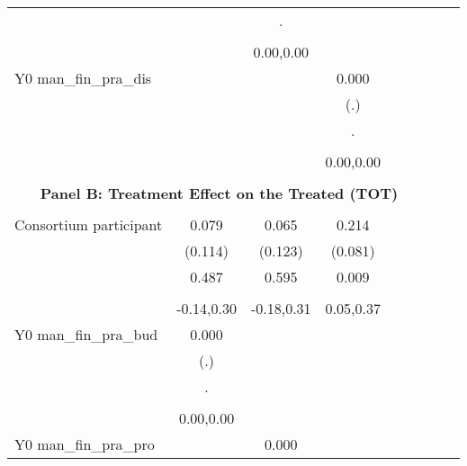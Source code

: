 \begin{table}[!h]
\begin{adjustbox}{width=\columnwidth,center}
\begin{tabular}{l*{8}{c}}
                    &                     &           .         &                     \\
                    &                     &                     &                     \\
                    &                     &   0.00,0.00         &                     \\
Y0 man\_fin\_pra\_dis  &                     &                     &       0.000         \\
                    &                     &                     &         (.)         \\
                    &                     &                     &           .         \\
                    &                     &                     &                     \\
                    &                     &                     &   0.00,0.00         \\
\hline \\ \multicolumn{7}{c}{\textbf{Panel B: Treatment Effect on the Treated (TOT)}} \\\\[-1ex]
Consortium participant&       0.079         &       0.065         &       0.214\sym{***}\\
                    &     (0.114)         &     (0.123)         &     (0.081)         \\
                    &       0.487         &       0.595         &       0.009         \\
                    &                     &                     &                     \\
                    &  -0.14,0.30         &  -0.18,0.31         &   0.05,0.37         \\
Y0 man\_fin\_pra\_bud  &       0.000         &                     &                     \\
                    &         (.)         &                     &                     \\
                    &           .         &                     &                     \\
                    &                     &                     &                     \\
                    &   0.00,0.00         &                     &                     \\
Y0 man\_fin\_pra\_pro  &                     &       0.000         &                     \\

\end{tabular}
\end{adjustbox}
\end{table}
